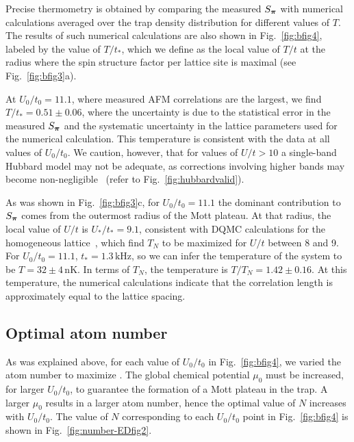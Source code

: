 Precise thermometry is obtained by comparing the measured $S_{\bm{\pi}}$ with
numerical calculations averaged over the trap density distribution for
different values of $T$.  The results of such numerical calculations are also
shown in Fig.~\ref{fig:bfig4}, labeled by the value of $T/t_{*}$, which we
define as the local value of $T/t$ at the radius where the spin structure
factor per lattice site is maximal (see Fig.~\ref{fig:bfig3}a).  

At $U_{0}/t_{0}=11.1$, where measured AFM correlations are the largest, we find
$T/t_{*}=0.51\pm0.06$,  where the uncertainty is due to the statistical error
in the measured $S_{\bm{\pi}}$ and the systematic uncertainty in the lattice
parameters used for the numerical calculation.  This temperature is consistent
with the data at all values of $U_{0}/t_{0}$.  We caution, however, that for
values of $U/t>10$  a single-band Hubbard model may not be adequate, as
corrections involving higher bands may become
non-negligible~\cite{Werner2005,Mathy2009} (refer to
Fig.~\ref{fig:hubbardvalid}). 

 
As was shown in Fig.~\ref{fig:bfig3}c,  for $U_{0}/t_{0}=11.1$ the dominant
contribution to $S_{\bm{\pi}}$ comes from the outermost radius of the Mott
plateau. At that radius, the local value of $U/t$ is $U_{*}/t_{*}=9.1$,
consistent with DQMC calculations for the homogeneous
lattice~\cite{Staudt2000,Paiva2011,Kozik2013}, which find $T_{N}$ to be
maximized for $U/t$ between 8 and 9.  For $U_{0}/t_{0}=11.1$,
$t_{*}=1.3\,\mathrm{kHz}$, so we can infer the temperature of the system to be
$T=32\pm4\,\mathrm{nK}$.   In terms of $T_{N}$, the temperature is
$T/T_{N}=1.42\pm0.16$.   At this temperature, the numerical calculations
indicate that the correlation length is approximately equal to the lattice
spacing. 

\subsection{Optimal atom number} 

As was explained above, for each value of $U_{0}/t_{0}$ in
Fig.~\ref{fig:bfig4}, we varied the atom number to maximize \sPi.   The global
chemical potential $\mu_{0}$ must be increased, for larger $U_{0}/t_{0}$, to
guarantee the formation of a Mott plateau in the trap.   A larger $\mu_{0}$
results in a larger atom number,  hence the optimal value of $N$ increases with
$U_{0}/t_{0}$.  The value of $N$ corresponding to each $U_{0}/t_{0}$ point in
Fig.~\ref{fig:bfig4} is shown in Fig.~\ref{fig:number-EDfig2}. 

